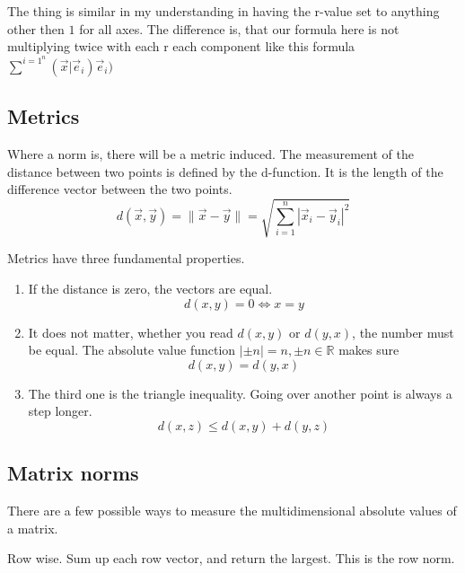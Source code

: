 \documentclass[a4paper]{article}
\begin{document}
\begin{Example}
The thing is similar in my understanding in having the r-value set to anything other then $1$ for all axes. The difference is, that our formula here is not multiplying twice with each r each component like this formula $\sum^{i=1}^{n}(\vec{x}|\vec{e}_{i})\vec{e}_{i})$




\subsection{Metrics}

Where a norm is, there will be a metric induced.
The measurement of the distance between two points is defined by the d-function. It is the length of the difference vector between the two points.\\

\begin{displaymath}
    d(\vec{x}, \vec{y}) = \|\vec{x}-\vec{y}\| = \sqrt{\sum_{i=1}^{n}|\vec{x}_{i}-\vec{y}_{i}|^2}
\end{displaymath}

Metrics have three fundamental properties.
\begin{enumerate}
\item If the distance is zero, the vectors are equal.
\begin{displaymath}
d(x,y) = 0 \iff x = y
\end{displaymath}
\item It does not matter, whether you read $d(x,y)$ or $d(y,x)$, the number must be equal. The absolute value function $|\pm n| = n, \pm n \in \mathbb{R}$ makes sure
\begin{displaymath}
d(x,y) = d(y,x)
\end{displaymath}
\item The third one is the triangle inequality. Going over another point is always a step longer.
\begin{displaymath}
d(x,z) \leq d(x,y) + d(y,z) 
\end{displaymath}
\end{enumerate}



\subsection{Matrix norms}

There are a few possible ways to measure the multidimensional absolute values of a matrix.

Row wise. Sum up each row vector, and return the largest. This is the row norm.


\end{Example}
\end{document}
